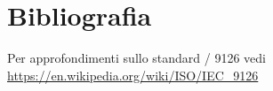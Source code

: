 \section{Bibliografia}
  \begin{thebibliography}{56}
     Per approfondimenti sullo standard / 9126 vedi \\
    \url{https://en.wikipedia.org/wiki/ISO/IEC_9126}
  \end{thebibliography}
